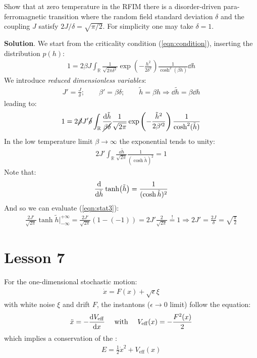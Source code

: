 \documentclass[../template.tex]{subfiles}
\begin{document}
\begin{exo}
    Show that at zero temperature in the RFIM there is a disorder-driven para-ferromagnetic transition where the random field standard deviation $\delta$ and the coupling $J$ satisfy $2J/\delta = \sqrt{\pi/2}$. For simplicity one may take $\delta=1$.

    \medskip

    \textbf{Solution}. We start from the criticality condition (\ref{eqn:condition}), inserting the distribution $p(h)$:
    \begin{align*}
        1 = 2\beta J \int_{\mathbb{R}} \frac{1}{\sqrt{2 \pi \delta^2}} \exp\left(-\frac{h^2}{2 \delta^2} \right) \frac{1}{\cosh^2 (\beta h)}\dd{h} 
    \end{align*}
    We introduce \textit{reduced dimensionless variables}:
    \begin{align*}
        J' = \frac{J}{\delta}; \qquad \beta' = \beta \delta; \qquad \tilde{h} = \beta h \Rightarrow \dd{\tilde{h}} = \beta\dd{h}  
    \end{align*}  
    leading to:
    \begin{align*}
        1 = 2\cancel{ \beta} J' \cancel{\delta} \int_{\mathbb{R}} \frac{\dd{\tilde{h}}}{\cancel{\beta \delta}} \frac{1}{\sqrt{2 \pi}}   \exp\left(-\frac{\tilde{h}^2}{2 \beta'^2} \right) \frac{1}{\cosh^2(\tilde{h})} 
    \end{align*}
    In the low temperature limit $\beta \to \infty$ the exponential tends to unity:
    \begin{align} \label{eqn:stat3}
        2 J' \int_{\mathbb{R}} \frac{\dd{\tilde{h}}}{\sqrt{2 \pi}} \frac{1}{(\cosh \tilde{h})^2}   = 1
    \end{align}
    Note that:
    \begin{align*}
        \dv{\tilde{h}} \tanh(\tilde{h}) = \frac{1}{(\cosh\tilde{h})^2} 
    \end{align*}
    And so we can evaluate (\ref{eqn:stat3}):
    \begin{align*}
        \frac{2J'}{\sqrt{2\pi}}  \tanh \tilde{h} \Big|_{-\infty}^{+\infty} = \frac{2J'}{\sqrt{2 \pi}}  (1-(-1)) = 2J' \frac{2}{\sqrt{2 \pi}}  \overset{!}{=}  1 \Rightarrow 2 J' = \frac{2J}{\delta} = \sqrt{\frac{\pi}{2} } 
    \end{align*}
\end{exo}

\chapter{Lesson 7}
For the one-dimensional stochastic motion:
\begin{align*}
    \dot{x} = F(x) + \sqrt{\epsilon} \xi
\end{align*}
with white noise $\xi$ and drift $F$, the instantons ($\epsilon \to 0$ limit) follow the equation:
\begin{align*}
    \ddot{x} = -\dv{V_{\mathrm{eff} }}{x}\quad \text{ with } \quad V_{\mathrm{eff} }(x) = -\frac{F^2(x)}{2} 
\end{align*}
which implies a conservation of the :
\begin{align*}
    E = \frac{1}{2} \dot{x}^2 + V_{\mathrm{eff} }(x) 
\end{align*}
\end{document}
